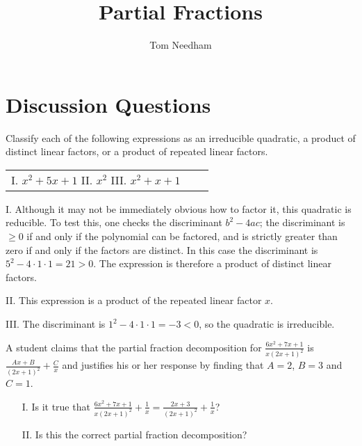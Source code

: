 \documentclass[handout]{ximera}
\author{Tom Needham}
\title[]{Partial Fractions}
\begin{document}
\begin{abstract}
\end{abstract}
\maketitle

\vspace{-0.9in}

\section{Discussion Questions}

\begin{problem}
Classify each of the following expressions as an irreducible quadratic, a product of distinct linear factors, or a product of repeated linear factors.
\begin{center}
\begin{tabular}{lll}
I. $x^2+5x+1$ \hspace{.4in} II. $x^2$ \hspace{.4in} III. $x^2+x+1$
\end{tabular}
\end{center}
\end{problem}

\begin{freeResponse}
I. Although it may not be immediately obvious how to factor it, this quadratic is reducible. To test this, one checks the discriminant $b^2-4ac$; the discriminant is  $\geq 0$ if and only if the polynomial can be factored, and is strictly greater than zero if and only if the factors are distinct. In this case the discriminant is $5^2-4 \cdot 1 \cdot 1 = 21 > 0$. The expression is therefore a product of distinct linear factors.

II. This expression is a product of the repeated linear factor $x$.

III. The discriminant is $1^2-4 \cdot 1 \cdot 1 = -3 < 0$, so the quadratic is irreducible.
\end{freeResponse}

\begin{problem}
A student claims that the partial fraction decomposition for $\frac{6x^2+7x+1}{x(2x+1)^2}$ is $\frac{Ax+B}{(2x+1)^2}+\frac{C}{x}$ and justifies his or her response by finding that $A=2$, $B=3$ and $C=1$.

\begin{itemize}
\item[I.] Is it true that $\frac{6x^2+7x+1}{x(2x+1)^2}+\frac{1}{x} = \frac{2x+3}{(2x+1)^2}+\frac{1}{x}$?
\item[II.] Is this the correct partial fraction decomposition?
\end{itemize}
\end{problem}
\end{document}
